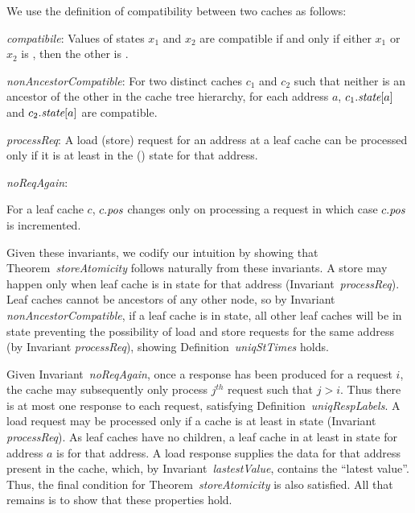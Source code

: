 We use the definition of compatibility between two caches as follows:
\begin{defn}
\textit{compatibile}: Values of states $x_1$ and $x_2$ are compatible if and only if
either $x_1$ or $x_2$ is \Mo{}, then the other is \In.
\label{compatible}
\end{defn}

\begin{inv}
\textit{nonAncestorCompatible}: For two distinct caches $c_1$ and $c_2$ such
that neither is an ancestor of the other in the cache tree hierarchy, for each
address $a$, $c_1.\textit{state}[a]$ and $c_2.\textit{state}[a]$ are compatible.
\label{nonAncestorCompatible}
\end{inv}

\begin{inv}
\textit{processReq}: A load (store) request for an address at a leaf cache can
be processed only if it is at least in the \Sh{} (\Mo) state for that address.
\label{processReq}
\end{inv}

\begin{inv}
\textit{noReqAgain}:
\item For a leaf cache $c$, $c.\textit{pos}$ changes only on processing a request in
which case $c.\textit{pos}$ is incremented.
\label{noReqAgain}
\end{inv}

Given these invariants, we codify our intuition by showing that
Theorem~\textit{storeAtomicity} follows naturally from these
invariants.  A store may happen only when leaf cache is in \Mo{} state
for that address (Invariant~\textit{processReq}). Leaf caches cannot
be ancestors of any other node, so by Invariant
\textit{nonAncestorCompatible}, if a leaf cache is in \Mo{} state, all
other leaf caches will be in \In{} state preventing the possibility of
load and store requests for the same address (by Invariant
\textit{processReq}), showing Definition~\textit{uniqStTimes} holds.

Given Invariant~\textit{noReqAgain}, once a response has been produced
for a request $i$, the cache may subsequently only process $j^{th}$
request such that $j > i$. Thus there is at most one response to each
request, satisfying Definition~\textit{uniqRespLabels}. A load request
may be processed only if a cache is at least in \Sh{} state (Invariant
\textit{processReq}). As leaf caches have no children, a leaf cache in
at least in \Sh{} state for address $a$ is \clean for that address. A
load response supplies the data for that address present in the cache,
which, by Invariant~\textit{lastestValue}, contains the ``latest
value''. Thus, the final condition for Theorem~\textit{storeAtomicity}
is also satisfied. All that remains is to show that these properties hold.


